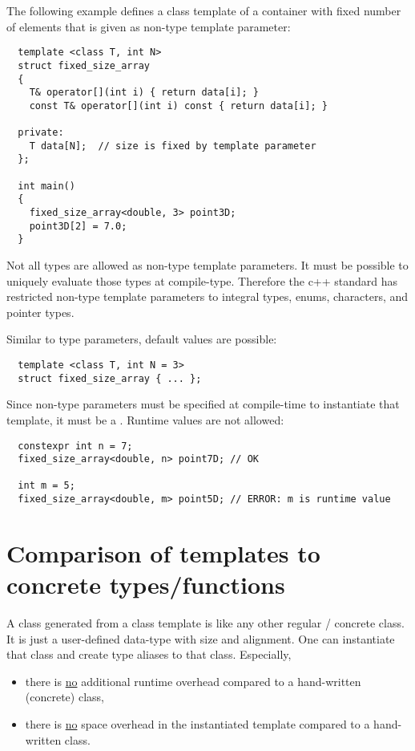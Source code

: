 The following example defines a class template of a container with fixed number of elements that is given as non-type template parameter:
\begin{verbatim}
  template <class T, int N>
  struct fixed_size_array
  {
    T& operator[](int i) { return data[i]; }
    const T& operator[](int i) const { return data[i]; }

  private:
    T data[N];  // size is fixed by template parameter
  };

  int main()
  {
    fixed_size_array<double, 3> point3D;
    point3D[2] = 7.0;
  }
\end{verbatim}

\begin{rem}
  Not all types are allowed as non-type template parameters. It must be possible to uniquely evaluate those types at compile-type. Therefore the c++
  standard has restricted non-type template parameters to integral types, enums, characters, and pointer types.
\end{rem}

Similar to type parameters, default values are possible:
\begin{verbatim}
  template <class T, int N = 3>
  struct fixed_size_array { ... };
\end{verbatim}

Since non-type parameters must be specified at compile-time to instantiate that template, it must be a . Runtime values are not allowed:
\begin{verbatim}
  constexpr int n = 7;
  fixed_size_array<double, n> point7D; // OK

  int m = 5;
  fixed_size_array<double, m> point5D; // ERROR: m is runtime value
\end{verbatim}


\section{Comparison of templates to concrete types/functions}
A class generated from a class template is like any other regular / concrete class. It is just a user-defined data-type with size and alignment.
One can instantiate that class and create type aliases to that class. Especially,
\begin{itemize}
  \item there is \underline{no} additional runtime overhead compared to a hand-written (concrete) class,
  \item there is \underline{no} space overhead in the instantiated template compared to a hand-written class.
\end{itemize}

